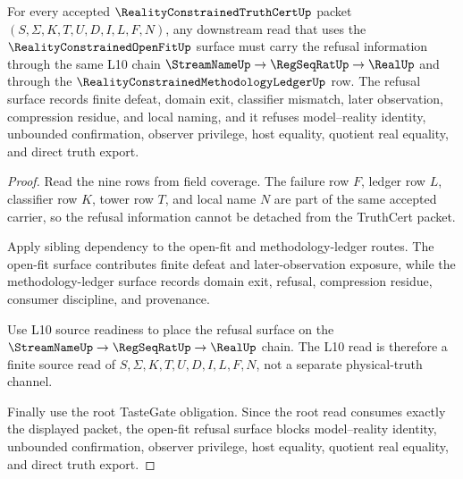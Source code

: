 \begin{theorem}
\label{thm:reality-constrained-truth-cert-open-fit-refusal-surface}
For every accepted $\RealityConstrainedTruthCertUp$ packet
$(S,\Sigma,K,T,U,D,I,L,F,N)$, any downstream read that uses the
$\RealityConstrainedOpenFitUp$ surface must carry the refusal information
through the same L10 chain $\StreamNameUp \to \RegSeqRatUp \to \RealUp$ and
through the $\RealityConstrainedMethodologyLedgerUp$ row. The refusal surface
records finite defeat, domain exit, classifier mismatch, later observation,
compression residue, and local naming, and it refuses model--reality identity,
unbounded confirmation, observer privilege, host equality, quotient real
equality, and direct truth export.
\end{theorem}
\begin{proof}
Read the nine rows from field coverage. The failure row $F$, ledger row $L$,
classifier row $K$, tower row $T$, and local name $N$ are part of the same
accepted carrier, so the refusal information cannot be detached from the
TruthCert packet.

Apply sibling dependency to the open-fit and methodology-ledger routes. The
open-fit surface contributes finite defeat and later-observation exposure,
while the methodology-ledger surface records domain exit, refusal, compression
residue, consumer discipline, and provenance.

Use L10 source readiness to place the refusal surface on the
$\StreamNameUp \to \RegSeqRatUp \to \RealUp$ chain. The L10 read is therefore a
finite source read of $S,\Sigma,K,T,U,D,I,L,F,N$, not a separate physical-truth
channel.

Finally use the root TasteGate obligation. Since the root read consumes exactly
the displayed packet, the open-fit refusal surface blocks model--reality
identity, unbounded confirmation, observer privilege, host equality, quotient
real equality, and direct truth export.
\end{proof}
